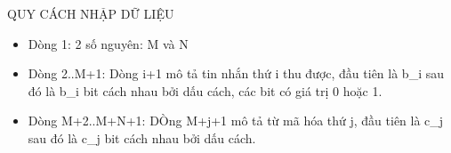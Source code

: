 QUY CÁCH NHẬP DỮ LIỆU
\begin{itemize}
	\item     Dòng 1: 2 số nguyên: M và N   
	\item     Dòng 2..M+1: Dòng i+1 mô tả tin nhắn thứ i thu được, đầu tiên là b\_i         sau đó là b\_i bit cách nhau bởi dấu cách, các bit có giá trị 0 hoặc 1.   
	\item     Dòng M+2..M+N+1: DÒng M+j+1 mô tả từ mã hóa thứ j, đầu tiên là c\_j         sau đó là c\_j bit cách nhau bởi dấu cách.   
\end{itemize}